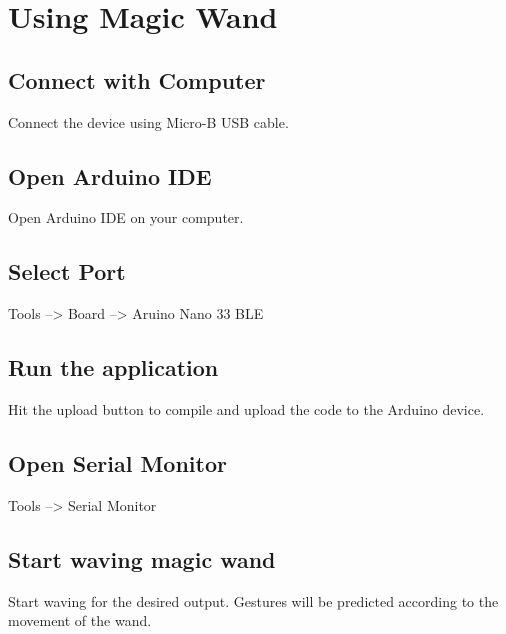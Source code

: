 %
%



\chapter{Using Magic Wand}

\section{Connect with Computer}
Connect the device using Micro-B USB cable.
\section{Open Arduino IDE}
Open Arduino IDE on your computer.
\section{Select Port}
Tools --> Board --> Aruino Nano 33 BLE
\section{Run the application}
Hit the upload button to compile and upload the code to the Arduino device.
\section{Open Serial Monitor}
Tools --> Serial Monitor
\section{Start waving magic wand}
Start waving for the desired output. Gestures will be predicted according to the movement of the wand.
